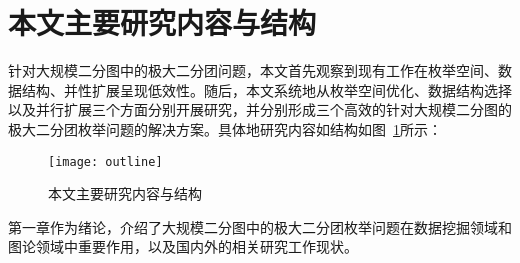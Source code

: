 

\section{本文主要研究内容与结构}

针对大规模二分图中的极大二分团问题，本文首先观察到现有工作在枚举空间、数据结构、并性扩展呈现低效性。随后，本文系统地从枚举空间优化、数据结构选择以及并行扩展三个方面分别开展研究，并分别形成三个高效的针对大规模二分图的极大二分团枚举问题的解决方案。具体地研究内容如结构如图~\ref{fig:outline}所示：

\begin{figure} [ht]
  \vspace{0.1 in}
  \centering
  \texttt{[image: outline]}
  \caption{本文主要研究内容与结构}
  \label{fig:outline}
\end{figure}

第一章作为绪论，介绍了大规模二分图中的极大二分团枚举问题在数据挖掘领域和图论领域中重要作用，以及国内外的相关研究工作现状。

